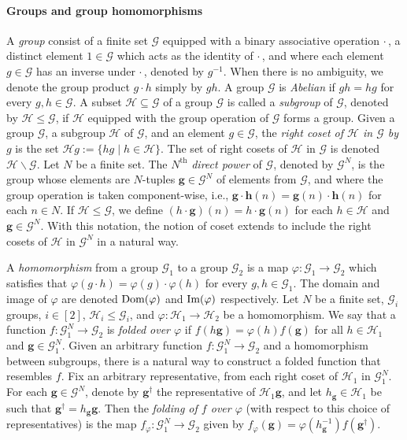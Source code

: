 \documentclass[a4paper,11pt]{article}
\theoremstyle{definition}
\newcommand{\gr}{\mathscr{G}}
\newcommand{\sgr}{\mathscr{H}}
\newcommand{\bg}{\mathbf{g}}
\newcommand{\bh}{\mathbf{h}}
\newcommand{\im}{\textnormal{Im}}
\newcommand{\dom}{\textnormal{Dom}}
\newcommand{\groupid}{1}
\begin{document}
\paragraph{Groups and group homomorphisms} A \emph{group} consist of a finite set $\gr$ equipped with a binary associative operation $\cdot\,$, a distinct element $\groupid \in \gr$ which acts as the identity of $\cdot\,$, and where each element $g \in\gr$ has an inverse under $\cdot\,$, denoted by $g^{-1}$. When there is no ambiguity, we denote the group product $g\cdot h$ simply by $gh$.
%
A group $\gr$ is 
\emph{Abelian} if $gh=hg$ for every $g,h\in\gr$.
%
A subset $\sgr \subseteq \gr$ of a group $\gr$ is called a \emph{subgroup} of $\gr$, denoted by $\sgr \leq \gr$, if $\sgr$ equipped with the group operation of $\gr$ forms a group. 
%
Given a group $\gr$, a subgroup $\sgr$ of $\gr$, and an element $g \in\gr$, the \emph{right coset of $\sgr$ in $\gr$ by $g$} is the set $\sgr g :=\{h g \mid h \in \sgr\}$.
The set of right cosets of $\sgr$ in $\gr$ is denoted $\sgr \backslash \gr$.
%
Let $N$ be a finite set. The $N^{\text{th}}$ \emph{direct power} of $\gr$, denoted by $\gr^N$, is the group whose elements are $N$-tuples $\bg \in \gr^N$ of elements from $\gr$, and where the group operation is taken component-wise, i.e., $\bg \cdot \bh (n)= \bg(n) \cdot \bh(n)$ for each $n \in N$. If $\sgr \leq \gr$, we define $(h \cdot \bg)(n) = h \cdot \bg(n)$ for each $h \in \sgr$ and $\bg \in \gr^N$. With this notation, the notion of coset extends to include the right cosets of $\sgr$ in $\gr^N$ in a natural way. 

A \emph{homomorphism} from a group $\gr_1$ to a group $\gr_2$ is a map $\varphi:\gr_1 \to \gr_2$ which satisfies that $\varphi(g \cdot h)=\varphi(g)\cdot \varphi(h)$ for every $g,h\in\gr_1$.
%
The domain and image of $\varphi$ are denoted $\dom(\varphi)$ and $\im(\varphi)$ respectively.
%
Let $N$ be a finite set, $\gr_i$ groups, $i \in [2]$, $\sgr_i \leq \gr_i$, and $\varphi:\sgr_1\to\sgr_2$ be a homomorphism. We say that a function $f:\gr_1^N \to \gr_2$ is \emph{folded over $\varphi$} if
    $f(h\bg)=\varphi(h)f(\bg)$ for all $h\in \sgr_1$ and $\bg\in \gr_1^N$. Given an arbitrary function $f:\gr_1^N \to \gr_2$ and a homomorphism between subgroups, 
    there is a natural way to construct a folded function that resembles $f$. Fix an arbitrary representative, from each right coset of $\sgr_1$ in $\gr_1^N$. For each $\bg\in \gr^N$, denote by $\bg^\dagger$ the representative of $\sgr_1 \bg$, and let $h_\bg \in \sgr_1$ be such that 
    $\bg^\dagger = h_\bg \bg$. Then the \emph{folding of $f$ over $\varphi$} (with respect to this choice of representatives)
    is the map $f_\varphi: \gr_1^N \to \gr_2$
    given by $f_\varphi(\bg) = \varphi(h_\bg^{-1})f(\bg^\dagger)$.
\end{document}
